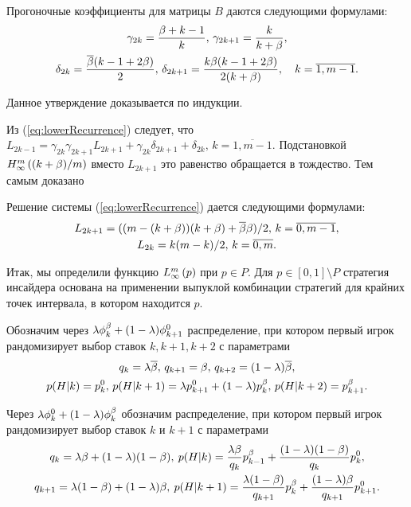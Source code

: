 \begin{proposition}
  \label{proposition:tridiagonal:coefficients}
  Прогоночные коэффициенты для матрицы $B$ даются следующими
  формулами\textup{:}
  \begin{multline*}
    \gamma_{2k} = \frac{\Co+k-1}{k}, \,
    \gamma_{2k+1} = \frac{k}{k+\Co}, \\
    \delta_{2k} = \frac{\DCo(k-1+2\Co)}{2}, \, \delta_{2k+1} =
    \frac{k\Co(k-1+2\Co)}{2(k+\Co)}, \quad k = \overline{1,m-1}.
  \end{multline*}
\end{proposition}
Данное утверждение доказывается по индукции.

Из (\ref{eq:lowerRecurrence}) следует, что $L_{2k-1} =
\gamma_{2k}\gamma_{2k+1}L_{2k+1} + \gamma_{2k}\delta_{2k+1} +
\delta_{2k}, \, k = \overline{1, m-1}$. Подстановкой
$\upperBound{(k+\Co)/m}$ вместо $L_{2k+1}$ это равенство обращается в
тождество. Тем самым доказано

\begin{proposition}
  \label{proposition:lower:recurrence-solution}
  Решение системы {\normalfont(\ref{eq:lowerRecurrence})} дается
  следующими формулами\textup{:}
  \begin{gather*}
    L_{2k+1} = ((m - (k + \Co))(k + \Co) + \DCo\Co)/2, \, k = \overline{0, m-1},\\
    L_{2k} = k (m-k)/2, \, k = \overline{0,m}.
  \end{gather*}
\end{proposition}

Итак, мы определили функцию $\lowerBound{p}$ при $p \in P$. Для %
$p \in [0, 1] \setminus P$ стратегия инсайдера основана на применении выпуклой
комбинации стратегий для крайних точек интервала, в котором находится $p$.

Обозначим через $\lambda\fOdd[k] + (1-\lambda)\fEven[k+1]$ распределение, при
котором первый игрок рандомизирует выбор ставок $k, k+1, k+2$ с параметрами
\begin{gather*}
  q_k = \lambda\DCo, \, q_{k+1} = \Co, \, q_{k+2} = (1-\lambda)\DCo,\\
  p(H|k) = \pEven, \, p(H|k+1) = \lambda \pEven[k+1] + (1-\lambda)
  \pOdd, \, p(H|k+2) = \pOdd[k+1].
\end{gather*}

Через $\lambda\fEven + (1-\lambda)\fOdd$ обозначим распределение, при котором
первый игрок рандомизирует выбор ставок $k$ и $k+1$ с параметрами
  \begin{gather*}
    q_k = \lambda\Co + (1-\lambda)(1-\Co), \: p(H|k) =
    \frac{\lambda\Co}{q_k}\pOdd[k-1] +
    \frac{(1-\lambda)(1-\Co)}{q_k} \pEven,\\
    q_{k+1} = \lambda(1-\Co) + (1-\lambda)\Co, \: p(H|k+1) =
    \frac{\lambda(1-\Co)}{q_{k+1}}\pOdd[k] +
    \frac{(1-\lambda)\Co}{q_{k+1}}\pEven[k+1].
  \end{gather*}

